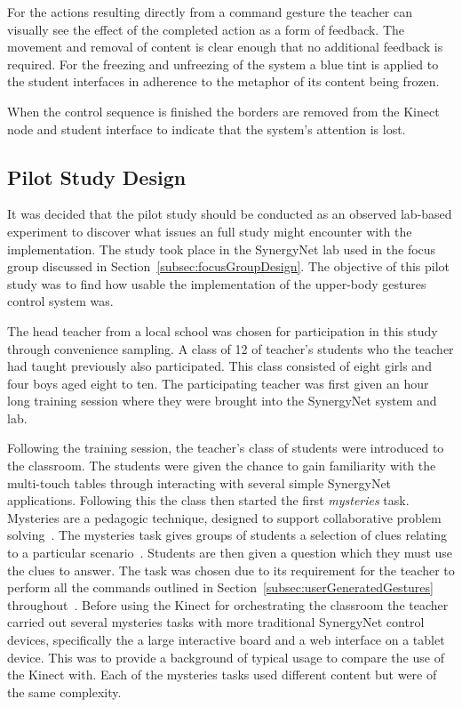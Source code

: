 \documentclass[link]{IWCOMP}
\begin{document}
For the actions resulting directly from a command gesture the teacher can visually see the effect of the completed action as a form of feedback.
The movement and removal of content is clear enough that no additional feedback is required.
For the freezing and unfreezing of the system a blue tint is applied to the student interfaces in adherence to the metaphor of its content being frozen.

When the control sequence is finished the borders are removed from the Kinect node and student interface to indicate that the system's attention is lost.

\subsection{Pilot Study Design}
\label{subsec:pilotStudyDesign}

It was decided that the pilot study should be conducted as an observed lab-based experiment to discover what issues an full study might encounter with the implementation.
The study took place in the SynergyNet lab used in the focus group discussed in Section~\ref{subsec:focusGroupDesign}.
The objective of this pilot study was to find how usable the implementation of the upper-body gestures control system was.

The head teacher from a local school was chosen for participation in this study through convenience sampling.
A class of 12 of teacher's students who the teacher had taught previously also participated.
This class consisted of eight girls and four boys aged eight to ten.
The participating teacher was first given an hour long training session where they were brought into the SynergyNet system and lab.  

Following the training session, the teacher's class of students were introduced to the classroom.
The students were given the chance to gain familiarity with the multi-touch tables through interacting with several simple SynergyNet applications.
Following this the class then started the first \textit{mysteries} task.
Mysteries are a pedagogic technique, designed to support collaborative problem solving~\cite{Leat2002}.
The mysteries task gives groups of students a selection of clues relating to a particular scenario~\cite{Higgins2011b}.
Students are then given a question which they must use the clues to answer.
The task was chosen due to its requirement for the teacher to perform all the commands outlined in Section~\ref{subsec:userGeneratedGestures} throughout~\cite{Mercier2012}.
Before using the Kinect for orchestrating the classroom the teacher carried out several mysteries tasks with more traditional SynergyNet control devices, specifically the a large interactive board and a web interface on a tablet device.
This was to provide a background of typical usage to compare the use of the Kinect with.
Each of the mysteries tasks used different content but were of the same complexity.  
\end{document}
